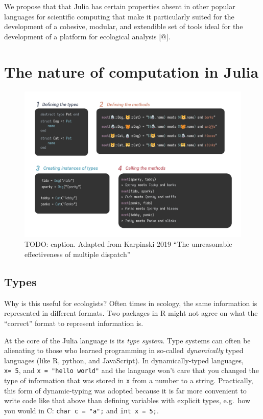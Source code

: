\documentclass[10pt,oneside]{article}
\makeatletter
\def\maxwidth{\ifdim\Gin@nat@width>\linewidth\linewidth
\else\Gin@nat@width\fi}
\let\Oldincludegraphics\includegraphics
\renewcommand{\includegraphics}[1]{\Oldincludegraphics[width=\maxwidth]{#1}}
\makeatother
\begin{document}
We propose that that Julia has certain properties absent in other
popular languages for scientific computing that make it particularly
suited for the development of a cohesive, modular, and extendible set of
tools ideal for the development of a platform for ecological analysis
{[}@{]}.

\hypertarget{the-nature-of-computation-in-julia}{%
\section{The nature of computation in
Julia}\label{the-nature-of-computation-in-julia}}

\begin{figure}
\centering
\includegraphics{./figures/multiple_dispatch.png}
\caption{TODO: caption. Adapted from Karpinski 2019 ``The unreasonable
effectiveness of multiple dispatch''}
\end{figure}

\hypertarget{types}{%
\subsection{Types}\label{types}}

Why is this useful for ecologists? Often times in ecology, the same
information is represented in different formats. Two packages in R might
not agree on what the ``correct'' format to represent information is.

At the core of the Julia language is its \emph{type system}. Type
systems can often be alienating to those who learned programming in
so-called \emph{dynamically} typed languages (like R, python, and
JavaScript). In dynamically-typed languages, \texttt{x=\ 5}, and
\texttt{x\ =\ "hello\ world"} and the language won't care that you
changed the type of information that was stored in \texttt{x} from a
number to a string. Practically, this form of dynamic-typing was adopted
because it is far more convenient to write code like that above than
defining variables with explicit types, e.g.~how you would in C:
\texttt{char\ c\ =\ "a";} and \texttt{int\ x\ =\ 5;}.
\end{document}
